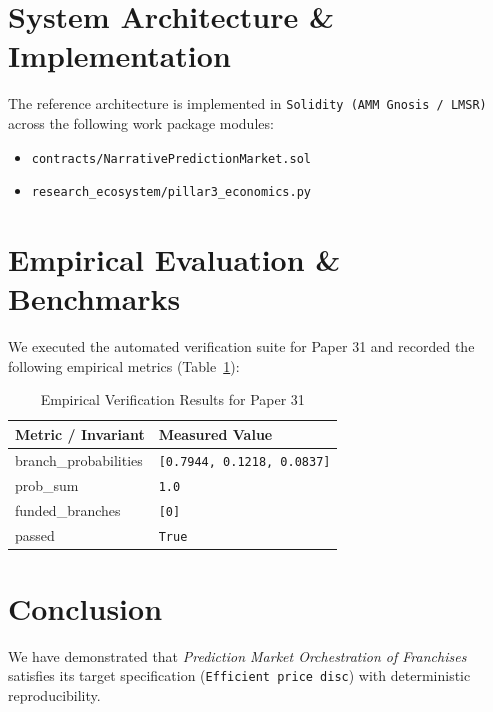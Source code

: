 \documentclass[10pt,twocolumn]{article}
\begin{document}
\section{System Architecture \& Implementation}
The reference architecture is implemented in \texttt{Solidity (AMM Gnosis / LMSR)} across the following work package modules:
\begin{itemize}
  \item \texttt{contracts/NarrativePredictionMarket.sol}
  \item \texttt{research\_ecosystem/pillar3\_economics.py}
\end{itemize}

\section{Empirical Evaluation \& Benchmarks}
We executed the automated verification suite for Paper 31 and recorded the following empirical metrics (Table~\ref{tab:metrics}):

\begin{table}[htbp]
\centering
\caption{Empirical Verification Results for Paper 31}
\label{tab:metrics}
\begin{tabular}{ll}
\toprule
\textbf{Metric / Invariant} & \textbf{Measured Value} \\
\midrule
    branch\_probabilities & \texttt{[0.7944, 0.1218, 0.0837]} \\
    prob\_sum & \texttt{1.0} \\
    funded\_branches & \texttt{[0]} \\
    passed & \texttt{True} \\
\bottomrule
\end{tabular}
\end{table}

\section{Conclusion}
We have demonstrated that \textit{Prediction Market Orchestration of Franchises} satisfies its target specification (\texttt{Efficient price disc}) with deterministic reproducibility.



\end{document}
